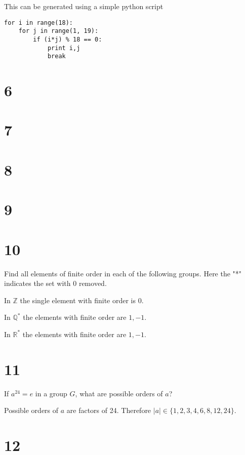 \documentclass[a4paper]{article}
\begin{document}
This can be generated using a simple python script

\begin{verbatim}
for i in range(18):
    for j in range(1, 19):
        if (i*j) % 18 == 0:
            print i,j
            break
\end{verbatim}


\section*{6}


\section*{7}


\section*{8}


\section*{9}


\section*{10}

Find all elements of finite order in each of the following groups. Here the "*" indicates the set with 0 removed.

\vspace{\baselineskip}

In $\mathbb{Z}$ the single element with finite order is $0.$

In $\mathbb{Q}^*$ the elements with finite order are $1, -1.$

In $\mathbb{R}^*$ the elements with finite order are $1, -1.$


\section*{11}

If $a^{24} = e$ in a group $G$, what are possible orders of $a$?

\vspace{\baselineskip}

Possible orders of $a$ are factors of 24. Therefore $|a| \in \{ 1, 2, 3, 4, 6, 8, 12, 24 \}$.


\section*{12}
\end{document}
